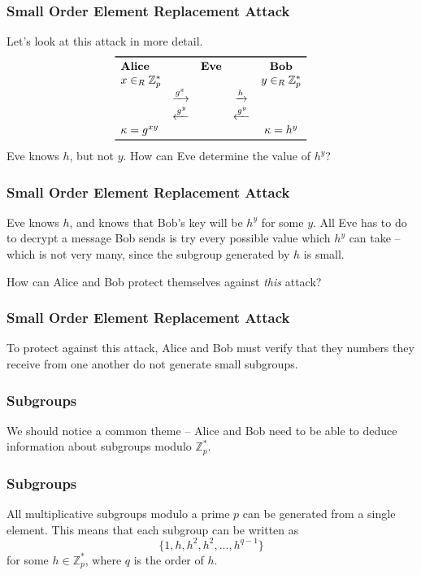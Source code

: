\documentclass{beamer}
\newcommand{\<}{\langle}
\renewcommand{\>}{\rangle}
\newcommand{\Z}{\mathbb{Z}}
\begin{document}
\begin{frame}
\frametitle{Small Order Element Replacement Attack}

Let's look at this attack in more detail. 
\[
\begin{array}{lcccccr}
\toprule
\textbf{Alice} &&\textbf{Eve}&& \textbf{Bob}  \\

x \in_R \Z_p^*&&&& y \in_R \Z_p^* \\

& \xrightarrow{ g^x} &&\xrightarrow{h}&\\

&\xleftarrow{g^y}&& \xleftarrow { g^y }  \\

\kappa = g^{xy} &&&& \kappa = h^y  \\
\bottomrule
\end{array}
\]
Eve knows $h$, but not $y$. How can Eve determine the value of $h^y$?
\end{frame}


\begin{frame}
\frametitle{Small Order Element Replacement Attack}

Eve knows $h$, and knows that Bob's key will be $h^y$ for some $y$. All Eve has to do to decrypt a message Bob sends is try every possible value which $h^y$ can take -- which is not very many, since the subgroup generated by $h$ is small.  \newline

How can Alice and Bob protect themselves against \emph{this} attack?
\end{frame}



\begin{frame}
\frametitle{Small Order Element Replacement Attack}

To protect against this attack, Alice and Bob must verify that they numbers they receive from one another do not generate small subgroups.
\end{frame}


\begin{frame}
\frametitle{Subgroups}

We should notice a common theme -- Alice and Bob need to be able to deduce information about subgroups modulo $\Z_p^*$.
\end{frame}


\begin{frame}
\frametitle{Subgroups}

All multiplicative subgroups modulo a prime $p$ can be generated from a single element. This means that each subgroup can be written as
\[
\{ 1, h, h^2, h^2, \dots, h^{q-1}\}
\]
for some $h\in\Z_p^*$, where $q$ is the order of $h$. 
\end{frame}
\end{document}
